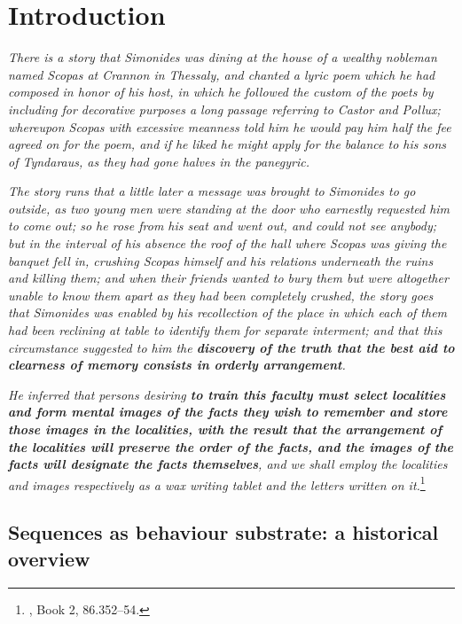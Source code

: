 \chapter{Introduction}


  \textit{ There is a story that Simonides was dining at the house of a wealthy
    nobleman named Scopas at Crannon in Thessaly, and chanted a lyric poem
    which he had composed in honor of his host, in which he followed the custom
    of the poets by including for decorative purposes a long passage referring
    to Castor and Pollux; whereupon Scopas with excessive meanness told him he
    would pay him half the fee agreed on for the poem, and if he liked he might
    apply for the balance to his sons of Tyndaraus, as they had gone halves in
  the panegyric.  }

  \textit{ The story runs that a little later a message was brought to
    Simonides to go outside, as two young men were standing at the door who
    earnestly requested him to come out; so he rose from his seat and went out,
    and could not see anybody; but in the interval of his absence the roof of
    the hall where Scopas was giving the banquet fell in, crushing Scopas
    himself and his relations underneath the ruins and killing them; and when
    their friends wanted to bury them but were altogether unable to know  them
    apart as they had been completely crushed, the story goes that Simonides
    was enabled by his  recollection of the place in which each of them had
    been reclining at table to identify them for separate interment; and that
    this circumstance suggested to him the \textbf{discovery of the truth that
    the best aid to clearness of memory consists in orderly arrangement}.  }

  \textit{ He inferred that persons desiring \textbf{to train this faculty must
    select localities and form mental images of the facts they wish to
    remember and store those images in the localities, with the result that
    the arrangement of the localities will preserve the order of the facts,
    and the images of the facts will designate the facts themselves}, and we
    shall employ the localities and images respectively as a wax writing tablet
  and the letters written on it.}\footnote{\cite{Cicero}, Book 2, 86.352--54.}

\section{Sequences as behaviour substrate: a historical overview}

